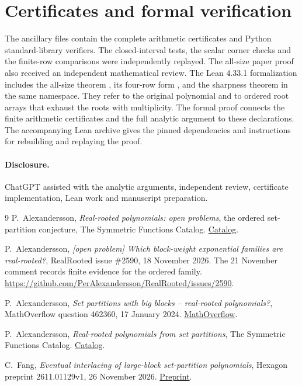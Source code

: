 \documentclass[11pt]{article}
\begin{document}
\section*{Certificates and formal verification}

The ancillary files contain the complete arithmetic certificates and
Python standard-library verifiers. The closed-interval tests, the
scalar corner checks and the finite-row comparisons were independently
replayed. The all-size paper proof also received an independent
mathematical review.
The Lean 4.33.1 formalization includes the all-size theorem
, its four-row form
, and the sharpness theorem
 in the same namespace. They refer to the original
polynomial and to ordered root arrays that exhaust the roots with
multiplicity. The formal proof connects the finite arithmetic
certificates and the full analytic argument to these declarations.
The accompanying Lean archive gives the pinned dependencies and
instructions for rebuilding and replaying the proof.

\paragraph{Disclosure.}
ChatGPT assisted with the analytic arguments, independent review,
certificate implementation, Lean work and manuscript preparation.

\begin{thebibliography}{9}
P.~Alexandersson, \emph{Real-rooted polynomials: open problems},
the ordered set-partition conjecture, The Symmetric Functions Catalog.
\href{https://www.symmetricfunctions.com/realRootedOpenProblems.htm\#set-partitions-and-trees}{Catalog}.

P.~Alexandersson, \emph{[open problem] Which block-weight exponential
families are real-rooted?}, RealRooted issue \#2590, 18 November 2026.
The 21 November comment records finite evidence for the ordered family.
\url{https://github.com/PerAlexandersson/RealRooted/issues/2590}.

P.~Alexandersson, \emph{Set partitions with big blocks -- real-rooted
polynomials?}, MathOverflow question 462360, 17 January 2024.
\href{https://mathoverflow.net/questions/462360}{MathOverflow}.

P.~Alexandersson, \emph{Real-rooted polynomials from set partitions},
The Symmetric Functions Catalog.
\href{https://www.symmetricfunctions.com/realRootedSetPartitions.htm}{Catalog}.

C.~Fang, \emph{Eventual interlacing of large-block set-partition
polynomials}, Hexagon preprint 2611.01129v1, 26 November 2026.
\href{https://hexagonmath.org/2611.01129v1}{Preprint}.
\end{thebibliography}
\end{document}
